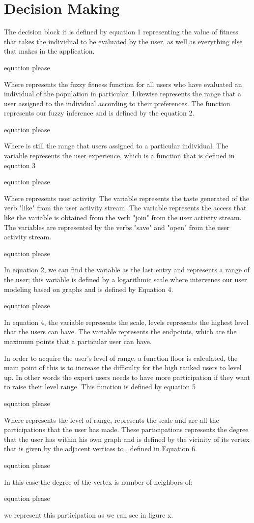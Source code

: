 \section{Decision Making}
The decision block it is defined by equation 1 representing the value of fitness that takes the individual to be evaluated by the user, as well as everything else that makes in the application.

equation please

Where  represents the fuzzy fitness function for all users who have evaluated an individual of the population in particular.
Likewise  represents the range that a user assigned to the individual according to their preferences. The function  represents our fuzzy inference and is defined by the equation 2.

equation please

Where  is still the range that users assigned to a particular individual. The variable represents the user experience, which is a function that is defined in equation 3

equation please

Where  represents user activity. The variable  represents the taste generated of the verb "like" from the user activity stream.
The variable  represents the access that like the variable  is obtained from the verb "join" from the user activity stream. The variables are represented by the verbs "save" and "open" from the user activity stream.

equation please

In equation 2, we can find the variable  as the last entry and represents a range of the user; this variable is defined by a logarithmic scale where intervenes our user modeling based on graphs and is defined by Equation 4.

equation please

In equation 4, the variable  represents the scale, levels represents the highest level that the users can have. The variable  represents the endpoints, which are the maximum points that a particular user can have.

In order to acquire the user's level of range, a function floor is calculated, the main point of this is to increase the difficulty for the high ranked users to level up. In other words the expert users needs to have more participation if they want to raise their level range. This function is defined by equation 5

equation please

Where  represents the level of range,  represents the scale and  are all the participations  that the user has made. These participations represents the degree that the user has within his own graph and is defined by the vicinity of its vertex  that is given by the adjacent vertices to , defined in Equation 6.

equation please

In this case the degree of the vertex is number of neighbors of: 

equation please

we represent this participation as we can see in figure x.









